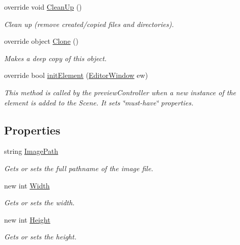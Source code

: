 \begin{DoxyCompactItemize}
override void \hyperlink{class_a_rdev_kit_1_1_model_1_1_project_1_1_image_augmentation_aecb9401ae2f65c089330e280af41d55a}{Clean\-Up} ()
\begin{DoxyCompactList}\small\item\em Clean up (remove created/copied files and directories). \end{DoxyCompactList}\item 
override object \hyperlink{class_a_rdev_kit_1_1_model_1_1_project_1_1_image_augmentation_af25172abfef48a1f9004ec3777d0d6fb}{Clone} ()
\begin{DoxyCompactList}\small\item\em Makes a deep copy of this object. \end{DoxyCompactList}\item 
override bool \hyperlink{class_a_rdev_kit_1_1_model_1_1_project_1_1_image_augmentation_a37ba80403f194a8aad7e7b96a8fd9239}{init\-Element} (\hyperlink{class_a_rdev_kit_1_1_editor_window}{Editor\-Window} ew)
\begin{DoxyCompactList}\small\item\em This method is called by the preview\-Controller when a new instance of the element is added to the Scene. It sets \char`\"{}must-\/have\char`\"{} properties. \end{DoxyCompactList}\end{DoxyCompactItemize}
\subsection*{Properties}
\begin{DoxyCompactItemize}
\item 
string \hyperlink{class_a_rdev_kit_1_1_model_1_1_project_1_1_image_augmentation_a499cb36152832a4dd29794e3c1dd2718}{Image\-Path}
\begin{DoxyCompactList}\small\item\em Gets or sets the full pathname of the image file. \end{DoxyCompactList}\item 
new int \hyperlink{class_a_rdev_kit_1_1_model_1_1_project_1_1_image_augmentation_a372f087469a33d84950310dfcd52e190}{Width}
\begin{DoxyCompactList}\small\item\em Gets or sets the width. \end{DoxyCompactList}\item 
new int \hyperlink{class_a_rdev_kit_1_1_model_1_1_project_1_1_image_augmentation_a5cecd83037a573b7f4fdfc7ebe6c7476}{Height}
\begin{DoxyCompactList}\small\item\em Gets or sets the height. \end{DoxyCompactList}\end{DoxyCompactItemize}
